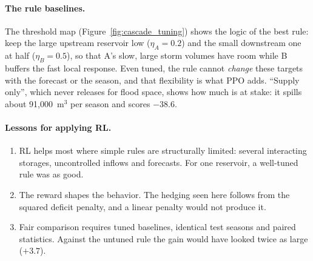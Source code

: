 \paragraph{The rule baselines.} The threshold map
(Figure~\ref{fig:cascade_tuning}) shows the logic of the best rule: keep
the large upstream reservoir low ($\eta_A=0.2$) and the small downstream
one at half ($\eta_B=0.5$), so that A's slow, large storm volumes have room
while B buffers the fast local response. Even tuned, the rule cannot
\emph{change} these targets with the forecast or the season, and that
flexibility is what PPO adds. ``Supply only'', which never releases for
flood space, shows how much is at stake: it spills about 91{,}000~m$^3$ per
season and scores $-38.6$.

\paragraph{Lessons for applying RL.}
\begin{enumerate}\itemsep1pt
\item RL helps most where simple rules are structurally limited: several
interacting storages, uncontrolled inflows and forecasts. For one
reservoir, a well-tuned rule was as good.
\item The reward shapes the behavior. The hedging seen here follows from
the squared deficit penalty, and a linear penalty would not produce it.
\item Fair comparison requires tuned baselines, identical test seasons and
paired statistics. Against the untuned rule the gain would have looked
twice as large ($+3.7$).
\end{enumerate}
